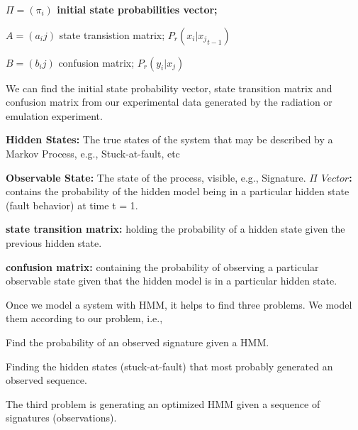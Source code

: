 \textbf{$\Pi = (\pi_i)$ initial state probabilities vector;}




$A = (a_ij)$ state transistion matrix;  \hspace{0.3cm} $P_r(x_i | {x_j}_{t-1})$

$B = (b_ij)$ confusion matrix;     \hspace{0.3cm}        $P_r(y_i | x_j)$


We can find the initial state probability vector, state transition matrix and confusion matrix  from our experimental data generated by the radiation or emulation experiment.

\textbf{Hidden States:} The true states of the system that may be described by a Markov Process, e.g., Stuck-at-fault, etc

\textbf{Observable State:} The state of the process, visible, e.g., Signature.
\textbf{$\Pi$ $Vector$:} contains the probability of the hidden model being in a particular hidden state (fault behavior) at time t = 1.

\textbf{state transition matrix:}  holding the probability of a hidden state given the previous hidden state.

\textbf{confusion matrix:} containing the probability of observing a particular observable state given that the hidden model is in a particular hidden state. 



Once we model a system with HMM, it helps to find three problems. We model them according to our problem, i.e.,

\begin{tcolorbox}[width=\textwidth,colback={gray},title={Evaluation },colbacktitle=gray,coltitle=black]  

Find the probability of an observed signature given a HMM.  
\end{tcolorbox}


\begin{tcolorbox}[width=\textwidth,colback={gray},title={Decoding },colbacktitle=gray,coltitle=black]  

Finding the hidden states (stuck-at-fault) that most probably generated an observed sequence. 
\end{tcolorbox}

\begin{tcolorbox}[width=\textwidth,colback={gray},title={Learning },colbacktitle=gray,coltitle=black]  

The third problem is generating an optimized HMM given a sequence of signatures (observations).
\end{tcolorbox}



